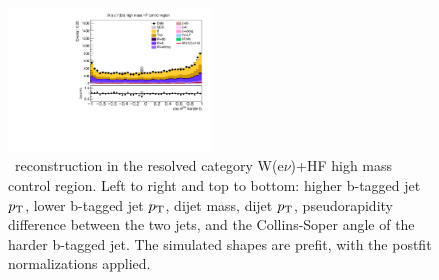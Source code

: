 \begin{figure}[tbp]
\begin{center}
    \includegraphics[width=0.48\textwidth]{figures/wlnhbb2016/resolved/WenWHHeavyFlavorCRHighMass_hbbCosThetaCSJ1.pdf}
    \caption{\HBB\ reconstruction in the resolved category W(e$\nu$)+HF high mass control region.
    Left to right and top to bottom: higher b-tagged jet $p_{\mathrm{T}}$, lower b-tagged jet $p_{\mathrm{T}}$, dijet mass, dijet $p_{\mathrm{T}}$, 
    pseudorapidity difference between the two jets, and the Collins-Soper angle of the harder b-tagged jet.
    The simulated shapes are prefit, with the postfit normalizations applied.}
    \label{fig:res_WenHFHighMass_Hbb}
  \end{center}
\end{figure}
\clearpage

